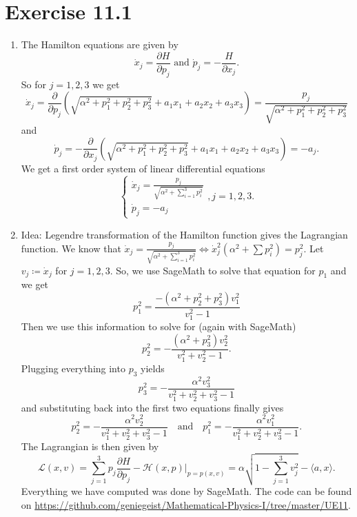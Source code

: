 \documentclass[a4paper]{article}
\theoremstyle{plain}
\begin{document}
\section*{Exercise 11.1}
\begin{enumerate}[label=(\roman*)]
	\item The Hamilton equations are given by 
	\[
		\dot x_j = \frac{\partial H}{\partial p_j} \text{ and } \dot p_j = -\frac{H}{\partial x_j}.
	\]
	So for $j = 1,2,3$ we get
	\[
		\dot x_j = \frac{\partial }{\partial p_j}\left( \sqrt{\alpha^2 + p_1^2 + p_2^2 + p_3^2} + a_1x_1 + a_2x_2 + a_3x_3 \right)  = \frac{p_j}{ \sqrt{\alpha^2 + p_1^2 + p_2^2 + p_3^2}} 
	\]
	and 
	\[
		\dot p_j = - \frac{\partial}{\partial x_j}(\sqrt{\alpha^2 + p_1^2 + p_2^2 + p_3^2} + a_1x_1 + a_2x_2 + a_3x_3) = -a_j.
	\]
	We get a first order system of linear differential equations
	\[
		\begin{cases}
			\dot x_j = \frac{p_j}{ \sqrt{\alpha^2 + \sum_{i=1}^3p_i^2}} \\
			 \dot p_j = -a_j
		\end{cases}, j = 1,2,3.
	\]
	
	\item Idea: Legendre transformation of the Hamilton function gives the Lagrangian function. We know that $\dot x_j = \frac{p_j}{ \sqrt{\alpha^2 + \sum_{i=1}^3p_i^2}} \iff \dot x_j^2 (\alpha^2 + \sum p_i^2) = p_j^2$. Let $v_j \coloneqq \dot x_j$ for $j=1,2,3$. So, we use SageMath to solve that equation for $p_1$ and we get
	\[
		p_1^2 = \frac{-(\alpha^2+p_2^2+p_3^2)v_1^2}{v_1^2-1}
	\]
	Then we use this information to solve for (again with SageMath)
	\[
		p_2^2 = - \frac{(\alpha^2 + p_3^2)v_2^2}{v_1^2+v_2^2-1}.
	\]
	Plugging everything into $p_3$ yields
	\[
		p_3^2 = - \frac{\alpha^2v_3^2}{v_1^2+v_2^2+v_3^2-1}
	\]
	and substituting back into the first two equations finally gives
	\[
		p_2^2 = - \frac{\alpha^2v_2^2}{v_1^2+v_2^2+v_3^2-1} \quad \text{and} \quad p_1^2 = - \frac{\alpha^2v_1^2}{v_1^2+v_2^2+v_3^2-1}.
	\]
	The Lagrangian is then given by
	\[
		\mathcal L(x,  v) = \sum^3_{j=1}  p_j \frac{\partial H}{\partial p_j} - \mathcal H(x,  p) \Bigg |_{p = p(x, v)} = \alpha\sqrt{1-\sum^3_{j=1} v_j^2} - \langle a,x \rangle.
	\]
	Everything we have computed was done by SageMath. The code can be found on \url{https://github.com/geniegeist/Mathematical-Physics-I/tree/master/UE11}.
	

\end{enumerate}
\end{document}
